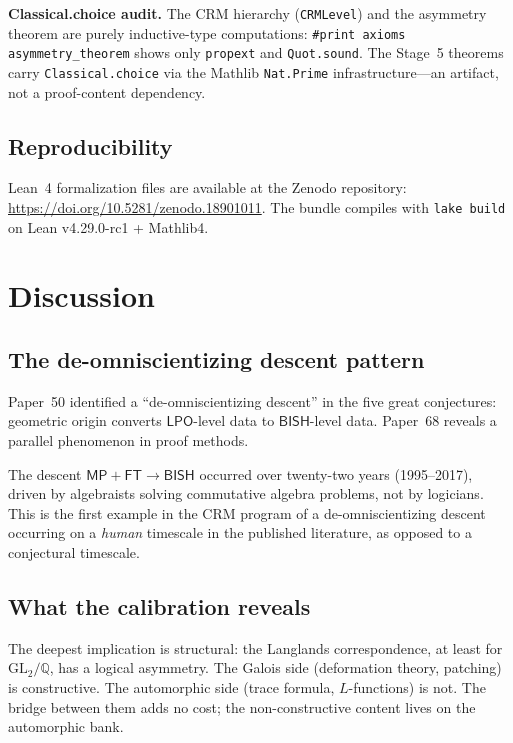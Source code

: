\documentclass[11pt]{article}
\theoremstyle{plain}
\theoremstyle{definition}
\theoremstyle{remark}
\newcommand{\leanRepo}{\url{https://doi.org/10.5281/zenodo.18901011}}
\newcommand{\Q}{\mathbb{Q}}
\newcommand{\GL}{\mathrm{GL}}
\newcommand{\BISH}{\mathsf{BISH}}
\newcommand{\LPO}{\mathsf{LPO}}
\newcommand{\MP}{\mathsf{MP}}
\newcommand{\FT}{\mathsf{FT}}
\begin{document}
\medskip\noindent
\begin{sloppypar}
\textbf{Classical.choice audit.}  The CRM hierarchy
(\texttt{CRMLevel}) and the asymmetry theorem are purely
inductive-type computations:
\texttt{\#print axioms asymmetry\_theorem}
shows only \texttt{propext} and \texttt{Quot.sound}.
The Stage~5 theorems carry
\texttt{Classical.choice} via the Mathlib
\texttt{Nat.Prime} infrastructure---an artifact, not
a proof-content dependency.
\end{sloppypar}

\subsection{Reproducibility}

Lean~4 formalization files are available at the Zenodo repository:
\leanRepo.  The bundle compiles with \texttt{lake build} on Lean
v4.29.0-rc1 + Mathlib4.


\section{Discussion}\label{sec:discuss}

\subsection{The de-omniscientizing descent pattern}

Paper~50 \cite{Paper50} identified a ``de-omniscientizing
descent'' in the five great conjectures: geometric origin converts
$\LPO$-level data to $\BISH$-level data.  Paper~68 reveals a
parallel phenomenon in proof methods.

The descent $\MP + \FT \to \BISH$ occurred over twenty-two
years (1995--2017), driven by algebraists solving commutative
algebra problems, not by logicians.  This is the first example
in the CRM program of a de-omniscientizing descent occurring on a
\emph{human} timescale in the published literature, as opposed
to a conjectural timescale.

\subsection{What the calibration reveals}

The deepest implication is structural: the Langlands
correspondence, at least for $\GL_2/\Q$, has a logical asymmetry.
The Galois side (deformation theory, patching) is constructive.
The automorphic side (trace formula, $L$-functions) is not.  The
bridge between them adds no cost; the non-constructive content
lives on the automorphic bank.
\end{document}
